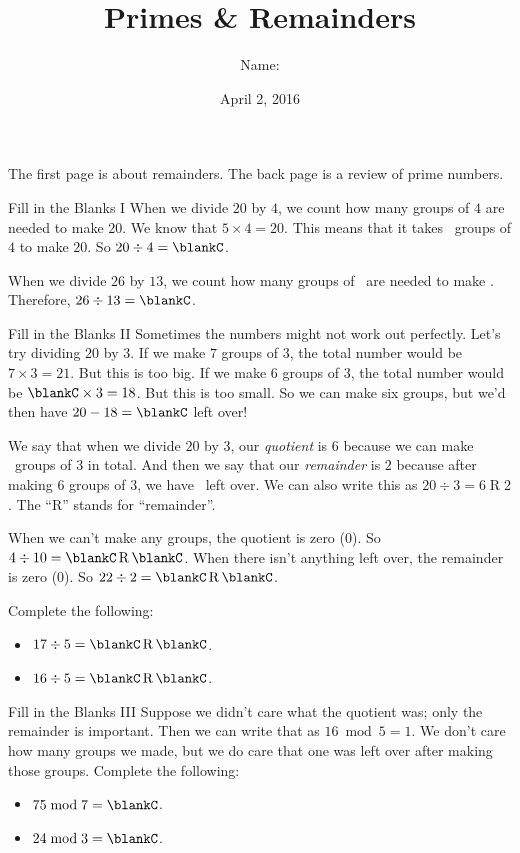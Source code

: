 \documentclass[12pt,letterpaper]{article}
\title{Primes \& Remainders}
\author{Name: \underline{\hspace{5cm}}}
\date{April 2, 2016}
\begin{document}
\maketitle

\thispagestyle{empty}

The first page is about remainders. The back page is a review of prime numbers.

\begin{problem}{Fill in the Blanks I}
 When we divide $20$ by $4$, we count how many groups of $4$ are needed to make
 $20$. We know that $5 \times 4 = 20$. This means that it takes \blankC\ groups of
 $4$ to make $20$. So $20 \div 4 = \blankC$.

 When we divide $26$ by $13$, we count how many groups of \blankC\ are needed to make
 \blankC. Therefore, $26 \div 13 = \blankC$.
\end{problem}

\begin{problem}{Fill in the Blanks II}
 Sometimes the numbers might not work out perfectly. Let's try dividing $20$ by
 $3$. If we make $7$ groups of $3$, the total number would be $7 \times 3 = 21$.
 But this is too big. If we make $6$ groups of $3$, the total number would be
 $\blankC \times 3 = 18$. But this is too small. So we can make six groups, but
 we'd then have $20 - 18 = \blankC$ left over!

 We say that when we divide $20$ by $3$, our \emph{quotient} is $6$ because we
 can make \blankC\ groups of $3$ in total. And then we say that our
 \emph{remainder} is $2$ because after making $6$ groups of $3$, we have \blankC\
 left over. We can also write this as $20 \div 3 = 6 \operatorname{R} 2$. The
 ``R'' stands for ``remainder''.

 When we can't make any groups, the quotient is zero ($0$). So $4 \div 10 = \blankC
 \operatorname{R} \blankC$. When there isn't anything left over, the remainder is zero
 ($0$). So $22 \div 2 = \blankC \operatorname{R} \blankC$.

 Complete the following: \begin{itemize}
  \item $17 \div 5 = \blankC \operatorname{R} \blankC$.
  \item $16 \div 5 = \blankC \operatorname{R} \blankC$.
 \end{itemize}
\end{problem}

\begin{problem}{Fill in the Blanks III}
 Suppose we didn't care what the quotient was; only the remainder is important. Then
 we can write that as $16 \bmod 5 = 1$. We don't care how many groups we made, but we
 do care that one was left over after making those groups. Complete the following:
 \begin{itemize}
  \item $75 \bmod 7 = \blankC$.
  \item $24 \bmod 3 = \blankC$.
 \end{itemize}
\end{problem}
\end{document}

